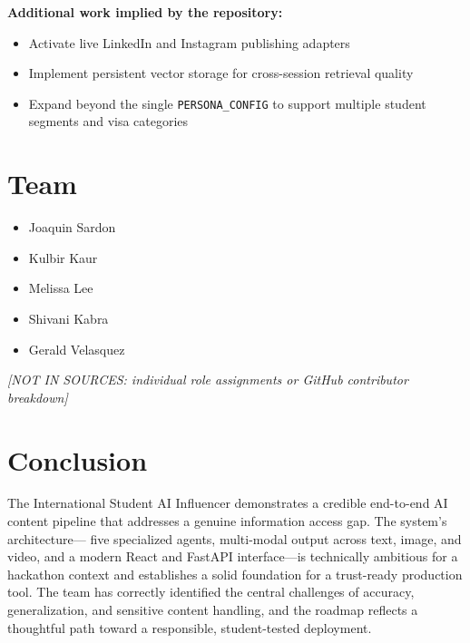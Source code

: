 \documentclass[12pt, letterpaper]{article}
\begin{document}
\textbf{Additional work implied by the repository:}
\begin{itemize}[leftmargin=1.5em]
  \item Activate live LinkedIn and Instagram publishing adapters
  \item Implement persistent vector storage for cross-session retrieval quality
  \item Expand beyond the single \texttt{PERSONA\_CONFIG} to support multiple student
    segments and visa categories
\end{itemize}

\section{Team}

\begin{itemize}[leftmargin=1.5em]
  \item Joaquin Sardon
  \item Kulbir Kaur
  \item Melissa Lee
  \item Shivani Kabra
  \item Gerald Velasquez
\end{itemize}

\emph{[NOT IN SOURCES: individual role assignments or GitHub contributor breakdown]}

\section{Conclusion}

The International Student AI Influencer demonstrates a credible end-to-end AI content
pipeline that addresses a genuine information access gap. The system's architecture---
five specialized agents, multi-modal output across text, image, and video, and a modern
React and FastAPI interface---is technically ambitious for a hackathon context and
establishes a solid foundation for a trust-ready production tool. The team has correctly
identified the central challenges of accuracy, generalization, and sensitive content
handling, and the roadmap reflects a thoughtful path toward a responsible, student-tested
deployment.
\end{document}

